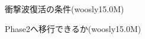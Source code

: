 \begin{figure}[htbp]
  \begin{center}
  \end{center}
  \caption{衝撃波復活の条件(woosly15.0M)}
  \label{fig:example_tau_t}
\end{figure}


\begin{figure}[htbp]
  \begin{center}
  \end{center}
  \caption{Phase2へ移行できるか(woosly15.0M)}
  \label{fig:example_v_t}
\end{figure}

